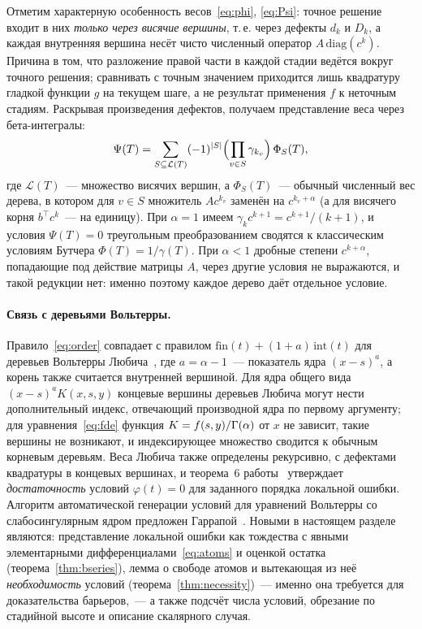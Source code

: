 Отметим характерную особенность весов~\eqref{eq:phi}, \eqref{eq:Psi}: точное решение входит в них \emph{только через висячие вершины}, т.\,е. через дефекты $d_k$ и $D_k$, а каждая внутренняя вершина несёт чисто численный оператор $A\,\mathrm{diag}(c^{k})$. Причина в том, что разложение правой части в каждой стадии ведётся вокруг точного решения; сравнивать с точным значением приходится лишь квадратуру гладкой функции $g$ на текущем шаге, а не результат применения $f$ к неточным стадиям. Раскрывая произведения дефектов, получаем представление веса через бета-интегралы:
\begin{equation}\label{eq:Psi-beta}
\Psi(T)=\sum_{S\subseteq\mathcal L(T)}(-1)^{|S|}\Bigl(\prod_{v\in S}\gamma_{k_v}\Bigr)\,\Phi_S(T),
\end{equation}
где $\mathcal L(T)$~--- множество висячих вершин, а $\Phi_S(T)$~--- обычный численный вес дерева, в котором для $v\in S$ множитель $Ac^{k_v}$ заменён на $c^{k_v+\alpha}$ (а для висячего корня $b^{\top}c^{k}$~--- на единицу). При $\alpha=1$ имеем $\gamma_kc^{k+1}=c^{k+1}/(k+1)$, и условия $\Psi(T)=0$ треугольным преобразованием сводятся к классическим условиям Бутчера $\Phi(T)=1/\gamma(T)$. При $\alpha<1$ дробные степени $c^{k+\alpha}$, попадающие под действие матрицы $A$, через другие условия не выражаются, и такой редукции нет: именно поэтому каждое дерево даёт отдельное условие.

\paragraph{Связь с деревьями Вольтерры.} Правило~\eqref{eq:order} совпадает с правилом $\mathrm{fin}(t)+(1+a)\,\mathrm{int}(t)$ для деревьев Вольтерры Любича~\cite{Lubich1983}, где $a=\alpha-1$~--- показатель ядра $(x-s)^{a}$, а корень также считается внутренней вершиной. Для ядра общего вида $(x-s)^aK(x,s,y)$ концевые вершины деревьев Любича могут нести дополнительный индекс, отвечающий производной ядра по первому аргументу; для уравнения~\eqref{eq:fde} функция $K=f(s,y)/\Gamma(\alpha)$ от $x$ не зависит, такие вершины не возникают, и индексирующее множество сводится к обычным корневым деревьям. Веса Любича также определены рекурсивно, с дефектами квадратуры в концевых вершинах, и теорема~6 работы~\cite{Lubich1983} утверждает \emph{достаточность} условий $\varphi(t)=0$ для заданного порядка локальной ошибки. Алгоритм автоматической генерации условий для уравнений Вольтерры со слабосингулярным ядром предложен Гаррапой~\cite{Garrappa2010}. Новыми в настоящем разделе являются: представление локальной ошибки как тождества с явными элементарными дифференциалами~\eqref{eq:atoms} и оценкой остатка (теорема~\ref{thm:bseries}), лемма о свободе атомов и вытекающая из неё \emph{необходимость} условий (теорема~\ref{thm:necessity})~--- именно она требуется для доказательства барьеров,~--- а также подсчёт числа условий, обрезание по стадийной высоте и описание скалярного случая.

